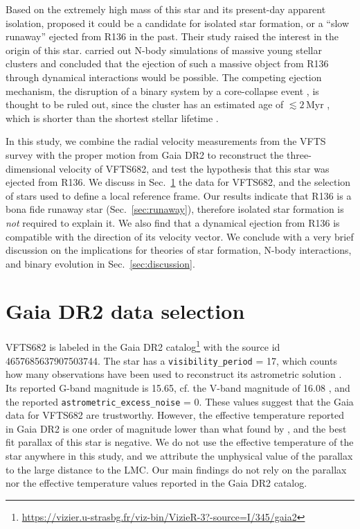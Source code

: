 \documentclass{aa}
\DeclareRobustCommand{\Secref}[1]{Sec.~\ref{#1}}
\begin{document}
Based on the extremely high mass of this star and
its present-day apparent isolation, \cite{bestenlehner:11} proposed it
could be a candidate for isolated star formation, or a ``slow runaway'' ejected
from R136 in the past. Their study raised the interest in the origin
of this star. \cite{fujii:11, banerjee:12} carried out N-body
simulations of massive young stellar clusters and concluded that the
ejection of such a massive object from R136 through dynamical
interactions \citep[e,g,][]{poveda:67} would be possible.
The competing ejection mechanism, the disruption of a binary
system by a core-collapse event \citep[][]{zwicky:57, blaauw:61}, is
thought to be ruled out, since the cluster has an estimated age of
$\lesssim2$\,Myr \citep[][]{sabbi:12}, which is shorter than the shortest stellar lifetime
\citep[$\sim$3\,Myr, e.g.,][]{zapartas:17}.

In this study, we combine the radial velocity measurements from the
VFTS survey \citep[][]{evans:11} with the proper motion from Gaia DR2
to reconstruct the three-dimensional velocity of VFTS682, and test the
hypothesis that this star was ejected from R136. We discuss in
\Secref{sec:sample} the data for VFTS682, and the selection of stars
used to define a local reference frame. Our results
indicate that R136 is a bona fide runaway star (\Secref{sec:runaway}),
therefore isolated star formation is \emph{not}
required to explain it. We also find that a dynamical ejection from
R136 is compatible with the direction of its velocity
vector. 
We conclude
with a very brief discussion on the implications for theories of
star formation, N-body interactions, and binary evolution in
\Secref{sec:discussion}.

\section{Gaia DR2 data selection}
\label{sec:sample}

VFTS682 is labeled in the Gaia DR2
catalog\footnote{\url{https://vizier.u-strasbg.fr/viz-bin/VizieR-3?-source=I/345/gaia2}} with the
source id 4657685637907503744. The star has a
\texttt{visibility\_period} = 17, which counts how many observations have
been used to reconstruct its astrometric solution
\citep[][]{lindengren:18}. Its reported G-band
magnitude is 15.65, cf. the V-band magnitude of 16.08
\citep[][]{evans:11, bestenlehner:11}, and the reported
\texttt{astrometric\_excess\_noise} = 0. These values suggest that the Gaia
data for VFTS682 are trustworthy. However, the effective temperature
reported in Gaia DR2 is one order of magnitude lower than what found by
\cite{bestenlehner:11}, and the best fit parallax of this star is
negative. We do not use the effective temperature of the star anywhere
in this study, and we attribute the unphysical value of the parallax
to the large distance to the LMC. Our main findings do not rely on the
parallax nor the effective temperature values reported in the Gaia DR2
catalog.
\end{document}

